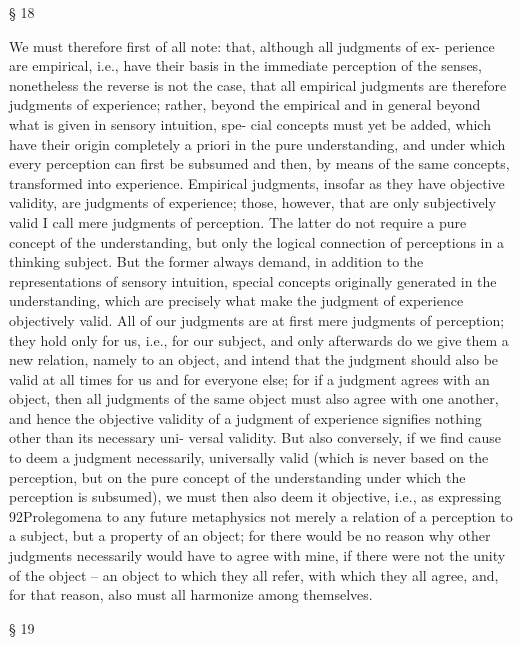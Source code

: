 § 18

We must therefore ﬁrst of all note: that, although all judgments of ex-
perience are empirical, i.e., have their basis in the immediate perception
of the senses, nonetheless the reverse is not the case, that all empirical
judgments are therefore judgments of experience; rather, beyond the
empirical and in general beyond what is given in sensory intuition, spe-
cial concepts must yet be added, which have their origin completely a
priori in the pure understanding, and under which every perception can
ﬁrst be subsumed and then, by means of the same concepts, transformed
into experience.
Empirical judgments, insofar as they have objective validity, are judgments
of experience; those, however, that are only subjectively valid I call mere
judgments of perception. The latter do not require a pure concept
of the understanding, but only the logical connection of perceptions in
a thinking subject. But the former always demand, in addition to the
representations of sensory intuition, special concepts originally generated
in the understanding, which are precisely what make the judgment of
experience objectively valid.
All of our judgments are at ﬁrst mere judgments of perception; they
hold only for us, i.e., for our subject, and only afterwards do we give
them a new relation, namely to an object, and intend that the judgment
should also be valid at all times for us and for everyone else; for if a
judgment agrees with an object, then all judgments of the same object
must also agree with one another, and hence the objective validity of a
judgment of experience signiﬁes nothing other than its necessary uni-
versal validity. But also conversely, if we ﬁnd cause to deem a judgment
necessarily, universally valid (which is never based on the perception, but
on the pure concept of the understanding under which the perception
is subsumed), we must then also deem it objective, i.e., as expressing
92Prolegomena to any future metaphysics
not merely a relation of a perception to a subject, but a property of an
object; for there would be no reason why other judgments necessarily
would have to agree with mine, if there were not the unity of the object –
an object to which they all refer, with which they all agree, and, for that
reason, also must all harmonize among themselves.

§ 19

